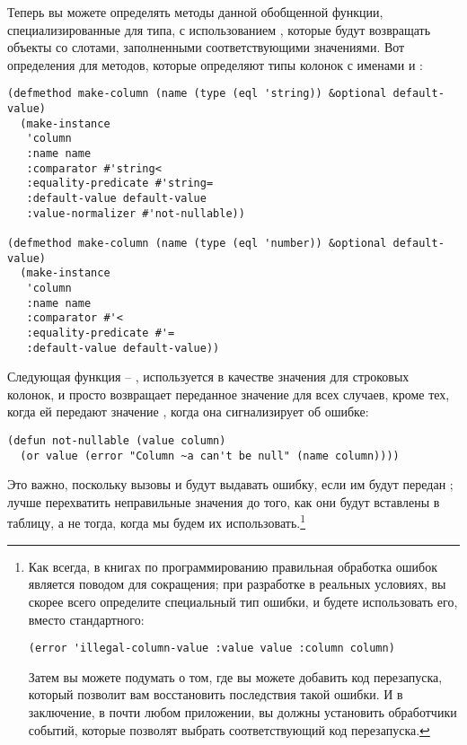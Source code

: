 Теперь вы можете определять методы данной обобщенной функции, специализированные для типа,
с использованием , которые будут возвращать объекты  со слотами,
заполненными соответствующими значениями.  Вот определения для методов, которые определяют
типы колонок с именами  и :

\begin{lstlisting}
(defmethod make-column (name (type (eql 'string)) &optional default-value)
  (make-instance
   'column 
   :name name
   :comparator #'string< 
   :equality-predicate #'string=
   :default-value default-value
   :value-normalizer #'not-nullable))

(defmethod make-column (name (type (eql 'number)) &optional default-value)
  (make-instance 
   'column
   :name name
   :comparator #'< 
   :equality-predicate #'=
   :default-value default-value))
\end{lstlisting}

Следующая функция -- , используется в качестве значения
 для строковых колонок, и просто возвращает переданное значение для
всех случаев, кроме тех, когда ей передают значение , когда она сигнализирует об
ошибке:

\begin{lstlisting}
(defun not-nullable (value column)
  (or value (error "Column ~a can't be null" (name column))))
\end{lstlisting}

Это важно, поскольку вызовы  и  будут выдавать ошибку, если им
будут передан ; лучше перехватить неправильные значения до того, как они будут
вставлены в таблицу, а не тогда, когда мы будем их использовать.\footnote{Как всегда, в
  книгах по программированию правильная обработка ошибок является поводом для сокращения;
  при разработке в реальных условиях, вы скорее всего определите специальный тип ошибки, и
  будете использовать его, вместо стандартного:

\begin{lstlisting}
(error 'illegal-column-value :value value :column column)
\end{lstlisting}

Затем вы можете подумать о том, где вы можете добавить код перезапуска, который позволит
вам восстановить последствия такой ошибки.  И в заключение, в почти любом приложении, вы
должны установить обработчики событий, которые позволят выбрать соответствующий код
перезапуска.}

